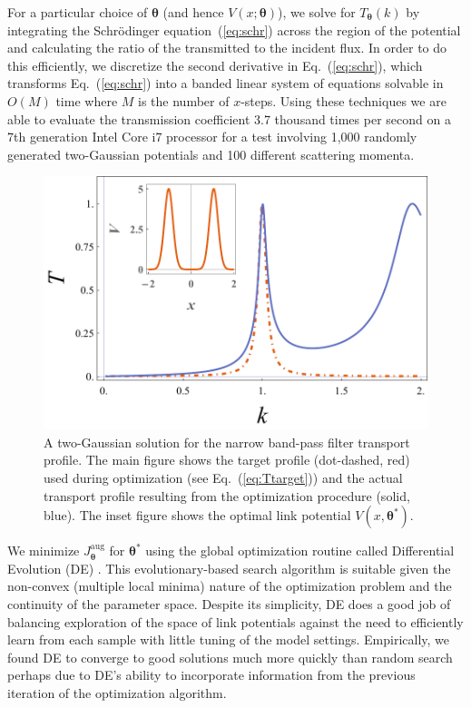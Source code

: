 \documentclass[twocolumn,amsmath,amssymb,showpacs,pra,superscriptaddress,aps]{revtex4-1}
\begin{document}
For a particular choice of $\bm{\theta}$ (and hence $V(x;\bm{\theta})$), we solve for $T_{\bm{\theta}}(k)$ by integrating the Schr{\"o}dinger equation~(\ref{eq:schr}) across the region of the potential and calculating the ratio of the transmitted to the incident flux. In order to do this efficiently, we discretize the second derivative in Eq.~(\ref{eq:schr}), which transforms Eq.~(\ref{eq:schr}) into
a banded linear system of equations solvable in $O(M)$ time where $M$ is the number of $x$-steps. Using these techniques we are able to evaluate the transmission coefficient 3.7 thousand times per second on a 7th generation Intel Core i7 processor for a test involving 1,000 randomly generated two-Gaussian potentials and 100 different scattering momenta. 

\begin{figure}
   \includegraphics[width=1\linewidth]{plot_transport_profiles_with_inset.pdf}
 \caption[Narrow band-pass filter link potential]{A two-Gaussian solution for the narrow band-pass filter transport profile. The main figure shows the target profile (dot-dashed, red) used during optimization (see Eq.~(\ref{eq:Ttarget})) and the actual transport profile resulting from the optimization procedure (solid, blue). The inset figure shows the optimal link potential $V(x, \bm{\theta^*})$.}
 \label{fig:method_illustration}
\end{figure}


We minimize $J_{\bm{\theta}}^{\mathrm{aug}}$ for $\bm{\theta}^*$ using the global optimization routine called Differential Evolution (DE) \cite{storn1997differential}. This evolutionary-based search algorithm is suitable given the non-convex (multiple local minima) nature of the optimization problem and the continuity of the parameter space. Despite its simplicity, DE does a good job of balancing exploration of the space of link potentials against the need to efficiently learn from each sample with little tuning of the model settings. Empirically, we found DE to converge to good solutions much more quickly than random search perhaps due to DE's ability to incorporate information from the previous iteration of the optimization algorithm. 
\end{document}
